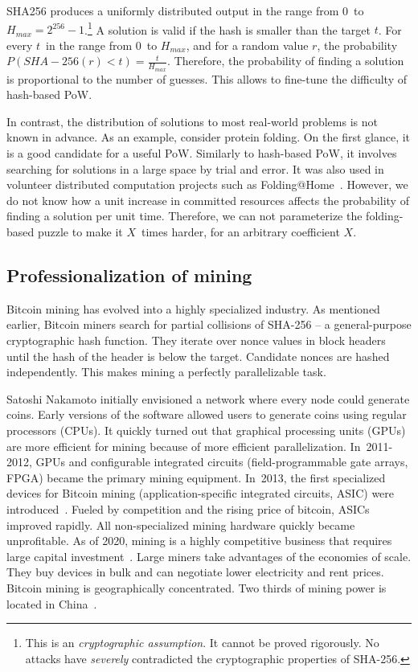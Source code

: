 SHA256 produces a uniformly distributed output in the range from $0$~to $H_{max} = 2^{256}-1$.\footnote{This is an \textit{cryptographic assumption}. It cannot be proved rigorously. No attacks have \textit{severely} contradicted the cryptographic properties of SHA-256.}
A solution is valid if the hash is smaller than the target $t$.
For every $t$~in the range from $0$~to $H_{max}$, and for a random value $r$, the probability $P(SHA-256(r) < t) = \frac{t}{H_{max}}$.
Therefore, the probability of finding a solution is proportional to the number of guesses.
This allows to fine-tune the difficulty of hash-based PoW.

In contrast, the distribution of solutions to most real-world problems is not known in advance.
As an example, consider protein folding.
On the first glance, it is a good candidate for a useful PoW.
Similarly to hash-based PoW, it involves searching for solutions in a large space by trial and error.
It was also used in volunteer distributed computation projects such as Folding@Home~\cite{Beberg2009}.
However, we do not know how a unit increase in committed resources affects the probability of finding a solution per unit time.
Therefore, we can not parameterize the folding-based puzzle to make it $X$~times harder, for an arbitrary coefficient $X$.


\subsection{Professionalization of mining}

Bitcoin mining has evolved into a highly specialized industry.
As mentioned earlier, Bitcoin miners search for partial collisions of SHA-256 -- a general-purpose cryptographic hash function.
They iterate over nonce values in block headers until the hash of the header is below the target.
Candidate nonces are hashed independently.
This makes mining a perfectly parallelizable task.

Satoshi Nakamoto initially envisioned a network where every node could generate coins.
Early versions of the software allowed users to generate coins using regular processors (CPUs).
It quickly turned out that graphical processing units (GPUs) are more efficient for mining because of more efficient parallelization.
In~2011-2012, GPUs and configurable integrated circuits (field-programmable gate arrays, FPGA) became the primary mining equipment.
In~2013, the first specialized devices for Bitcoin mining (application-specific integrated circuits, ASIC) were introduced~\cite{Kim2020}.
Fueled by competition and the rising price of bitcoin, ASICs improved rapidly.
All non-specialized mining hardware quickly became unprofitable.
As of 2020, mining is a highly competitive business that requires large capital investment~\cite{Kroll2013}.
Large miners take advantages of the economies of scale.
They buy devices in bulk and can negotiate lower electricity and rent prices.
Bitcoin mining is geographically concentrated.
Two thirds of mining power is located in China~\cite{Rauchs2020}.

